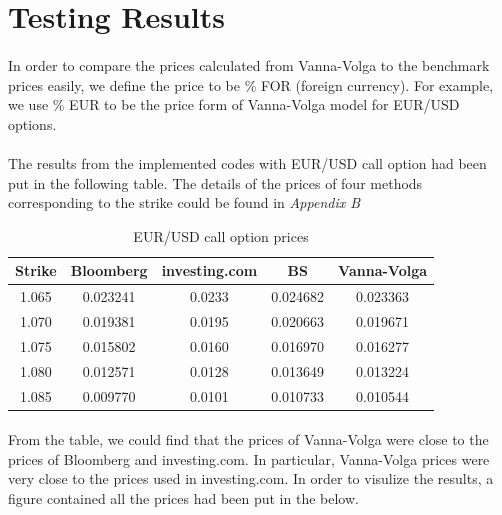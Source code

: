 \section{Testing Results}
\paragraph{}

In order to compare the prices calculated from Vanna-Volga to the benchmark prices easily, we define the price to be \% FOR (foreign currency). For example, we use \% EUR to be the price form of Vanna-Volga model for EUR/USD options.

\paragraph{}
The results from the implemented codes with EUR/USD call option had been put in the following table. The details of the prices of four methods corresponding to the strike could be found in \textit{Appendix B}

\begin{table}[htb]
\centering
\caption{EUR/USD call option prices}
\begin{tabular}{ccccc}
\hline \hline
Strike & Bloomberg & investing.com & BS & Vanna-Volga \\ [0.5ex]
\hline
1.065 &	0.023241&	0.0233	&0.024682&	0.023363 \\ 
1.070&	0.019381&	0.0195&	0.020663&	0.019671\\
1.075	&0.015802&	0.0160&	0.016970&	0.016277 \\
1.080	&0.012571&	0.0128&	0.013649&	0.013224\\
1.085	&0.009770&	0.0101&	0.010733&	0.010544 \\ [0.5ex]
\hline
\end{tabular}
\label{table:prices}
\end{table}

\paragraph{}
From the table, we could find that the prices of Vanna-Volga were close to the prices of Bloomberg and investing.com. In particular, Vanna-Volga prices were very close to the prices used in investing.com. In order to visulize the results, a figure contained all the prices had been put in the below.

